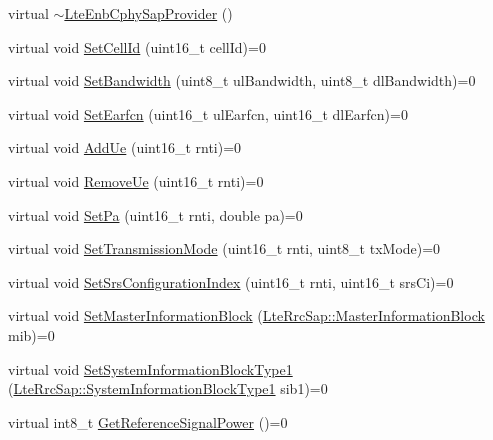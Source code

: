 \begin{DoxyCompactItemize}
\item 
virtual \hyperlink{classns3_1_1LteEnbCphySapProvider_a1937398cca792a92e494549b1d2cc560}{$\sim$\+Lte\+Enb\+Cphy\+Sap\+Provider} ()
\item 
virtual void \hyperlink{classns3_1_1LteEnbCphySapProvider_adb9c7f7c40e6b4bc13ea9f0affb6c899}{Set\+Cell\+Id} (uint16\+\_\+t cell\+Id)=0
\item 
virtual void \hyperlink{classns3_1_1LteEnbCphySapProvider_a08c5be3dacaf1cbcc7b0420c08a5ae9f}{Set\+Bandwidth} (uint8\+\_\+t ul\+Bandwidth, uint8\+\_\+t dl\+Bandwidth)=0
\item 
virtual void \hyperlink{classns3_1_1LteEnbCphySapProvider_a73524fff8dbd5cf50c5391b4445fac1a}{Set\+Earfcn} (uint16\+\_\+t ul\+Earfcn, uint16\+\_\+t dl\+Earfcn)=0
\item 
virtual void \hyperlink{classns3_1_1LteEnbCphySapProvider_afd189bf556174aded725bb530412f605}{Add\+Ue} (uint16\+\_\+t rnti)=0
\item 
virtual void \hyperlink{classns3_1_1LteEnbCphySapProvider_a91270ace0ff572f87ca50e95bbe9535e}{Remove\+Ue} (uint16\+\_\+t rnti)=0
\item 
virtual void \hyperlink{classns3_1_1LteEnbCphySapProvider_abab96a9f757274079b1fbf19ceb3ca07}{Set\+Pa} (uint16\+\_\+t rnti, double pa)=0
\item 
virtual void \hyperlink{classns3_1_1LteEnbCphySapProvider_a8a4d73d0cdc78ed87b9c0d2c2369545b}{Set\+Transmission\+Mode} (uint16\+\_\+t rnti, uint8\+\_\+t tx\+Mode)=0
\item 
virtual void \hyperlink{classns3_1_1LteEnbCphySapProvider_a276084368cd25b059537cb79abfc3939}{Set\+Srs\+Configuration\+Index} (uint16\+\_\+t rnti, uint16\+\_\+t srs\+Ci)=0
\item 
virtual void \hyperlink{classns3_1_1LteEnbCphySapProvider_af788891afaa88dbd56fbe86d1fe17ed2}{Set\+Master\+Information\+Block} (\hyperlink{structns3_1_1LteRrcSap_1_1MasterInformationBlock}{Lte\+Rrc\+Sap\+::\+Master\+Information\+Block} mib)=0
\item 
virtual void \hyperlink{classns3_1_1LteEnbCphySapProvider_a4408cac2d46e5d2e4a7ce21b79ed644e}{Set\+System\+Information\+Block\+Type1} (\hyperlink{structns3_1_1LteRrcSap_1_1SystemInformationBlockType1}{Lte\+Rrc\+Sap\+::\+System\+Information\+Block\+Type1} sib1)=0
\item 
virtual int8\+\_\+t \hyperlink{classns3_1_1LteEnbCphySapProvider_aefd1a9a93163ebf27300f82cd1aeca00}{Get\+Reference\+Signal\+Power} ()=0
\end{DoxyCompactItemize}


